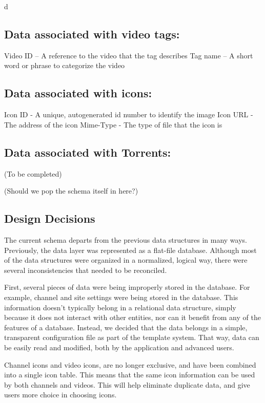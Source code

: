 d\documentclass[a4paper,12pt]{report}
\begin{document}
\subsection{Data associated with video tags:}
	Video ID – A reference to the video that the tag describes
	Tag name – A short word or phrase to categorize the video

\subsection{Data associated with icons:}
	Icon ID - A unique, autogenerated id number to identify the image
	Icon URL - The address of the icon
	Mime-Type - The type of file that the icon is


\subsection{Data associated with Torrents:}
(To be completed)

(Should we pop the schema itself in here?)

\subsection{Design Decisions}
The current schema departs from the previous data structures in many ways. Previously, the data layer was represented as a flat-file database. 
Although most of the data structures were organized in a normalized, logical way, there were several inconsistencies that needed to be reconciled.

First, several pieces of data were being improperly stored in the database. For example, channel and site settings were being stored in the database. This information doesn't typically belong in a relational data structure, simply because it does not interact with other entities, nor can it benefit from any of the features of a database. 
Instead, we decided that the data belongs in a simple, transparent configuration file as part of the template system. 
That way, data can be easily read and modified, both by the application and advanced users. 

Channel icons and video icons, are no longer exclusive, and have been combined into a single icon table. This means that the same icon information can be used by both channels and videos. This will help eliminate duplicate data, and give users more choice in choosing icons.
\end{document}

